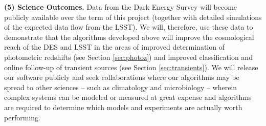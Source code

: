 \documentclass[prd,nofootbib,floatfix,11pt,tightenlines]{revtex4}
\begin{document}





{\bf (5) Science Outcomes.}  Data from the Dark Energy Survey will become
publicly available over the term of this project (together with detailed
simulations of the expected data flow from the LSST).  We will, therefore,
use these data to demonstrate that the algorithms developed above will
improve the cosmological reach of the DES and LSST in the areas of improved
determination of photometric redshifts (see Section \ref{sec:photoz}) and
improved classification and online follow-up of transient sources (see Section \ref{sec:transients}).  We will release our software
publicly and seek collaborations where our algorithms may be spread to
other sciences -- such as climatology and microbiology -- wherein complex
systems can be modeled or measured at great expense and algorithms are
required to determine which models and experiments are actually worth
performing.

\end{document}
